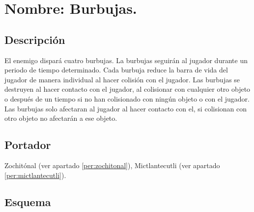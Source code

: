 \section{Nombre: Burbujas.}\label{hab.burbujas}
\subsection{Descripción}
El enemigo dispará cuatro burbujas. La burbujas seguirán al jugador durante un periodo de tiempo determinado. Cada burbuja reduce la barra de vida del jugador de manera individual al hacer colisión con el jugador. Las burbujas se destruyen al hacer contacto con el jugador, al colisionar con cualquier otro objeto o después de un tiempo si no han colisionado con ningún objeto o con el jugador. Las burbujas solo afectaran al jugador al hacer contacto con el, si colisionan con otro objeto no afectarán a ese objeto. 
\subsection{Portador}
Zochitónal (ver apartado \ref{per:zochitonal}),  Mictlantecutli (ver apartado \ref{per:mictlantecutli}).
\subsection{Esquema}
		
